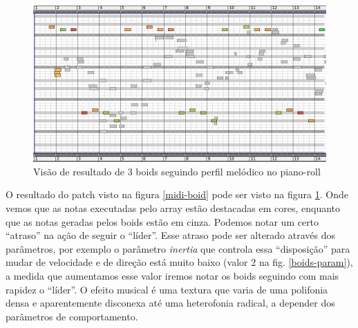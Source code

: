 \documentclass[draft]{ppgmus}
\begin{document}
\begin{figure}
\includegraphics[scale=.5]{boids-pianoroll}
\caption{Visão de resultado de 3 boids seguindo perfil melódico no piano-roll}
\label{boids-pianoroll}
\end{figure} 

O resultado do patch visto na figura \ref{midi-boid} pode ser visto
na figura \ref{boids-pianoroll}. Onde vemos que as notas executadas pelo array estão destacadas
em cores, enquanto que as notas geradas pelos boids estão em cinza. Podemos notar um certo ``atraso''
 na ação de seguir o ``líder''. Esse atraso pode ser alterado através dos parâmetros, por exemplo
o parâmetro \textit{inertia} que controla essa ``disposição'' para mudar de velocidade e de direção
está muito baixo (valor 2 na fig. \ref{boids-param}), a medida que aumentamos esse valor iremos notar
os boids seguindo com mais rapidez o ``líder''.
O efeito musical é uma textura que varia de uma polifonia densa e aparentemente disconexa até uma 
heterofonia radical, a depender dos parâmetros de comportamento.


\end{document}
